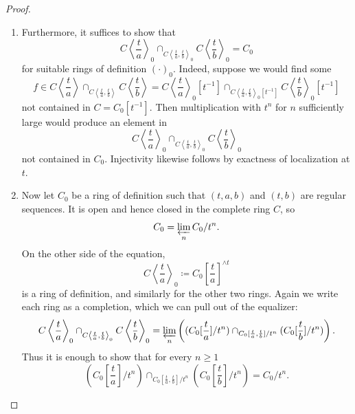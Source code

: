 \documentclass[10pt,twoside]{article}
\numberwithin{equation}{section}
\theoremstyle{plain}
\theoremstyle{definition}
\begin{document}
\begin{proof}
\begin{enumerate}
    \item Furthermore, it suffices to show that
    \[C\left\langle\frac{t}{a}\right\rangle_0
    \cap^{}_{C\left\langle\frac{t}{a},\frac{t}{b}\right\rangle_0} C\left\langle\frac{t}{b}\right\rangle_0=C_0\]
    for suitable rings of definition \((\cdot)_0\). Indeed, suppose we would find some
    \[f\in C\left\langle\frac{t}{a}\right\rangle
    \cap^{}_{C\left\langle\frac{t}{a},\frac{t}{b}\right\rangle}
    C\left\langle\frac{t}{b}\right\rangle
    =C\left\langle\frac{t}{a}\right\rangle_0[t^{-1}]
    \cap^{}_{C\left\langle\frac{t}{a},\frac{t}{b}\right\rangle_0[t^{-1}]} C\left\langle\frac{t}{b}\right\rangle_0[t^{-1}]\]
    not contained in \(C=C_0[t^{-1}]\). Then multiplication with \(t^n\) for \(n\) sufficiently large would produce an element in
    \[C\left\langle\frac{t}{a}\right\rangle_0
    \cap^{}_{C\left\langle\frac{t}{a},\frac{t}{b}\right\rangle_0}
    C\left\langle\frac{t}{b}\right\rangle_0\]
    not contained in \(C_0\). Injectivity likewise follows by exactness of localization at \(t\).

    \item Now let \(C_0\) be a ring of definition such that \((t,a,b)\) and \((t,b)\) are regular sequences. It is open and hence closed in the complete ring \(C\), so
    \[C_0=\varprojlim_n C_0/t^n.\]
    On the other side of the equation,
    \[C\left\langle\frac{t}{a}\right\rangle_0\coloneqq C_0[\frac t a]^{\wedge t}\]
    is a ring of definition, and similarly for the other two rings.
    Again we write each ring as a completion, which we can pull out of the equalizer:
    \[C\left\langle\frac{t}{a}\right\rangle_0
    \cap^{}_{C\left\langle\frac{t}{a},\frac{t}{b}\right\rangle_0}
    C\left\langle\frac{t}{b}\right\rangle_0
    =\varprojlim_n\left((C_0[\frac t a]/t^n)
    \cap_{C_0[\frac t a,\frac t b]/t^n}(C_0[\frac t b]/t^n)\right).\]
    Thus it is enough to show that for every \(n\geq1\)
    \[(C_0[\frac t a]/t^n)\cap_{C_0[\frac t a,\frac t b]/t^n}(C_0[\frac t b]/t^n)=C_0/t^n.\]


\end{enumerate}
\end{proof}
\end{document}
